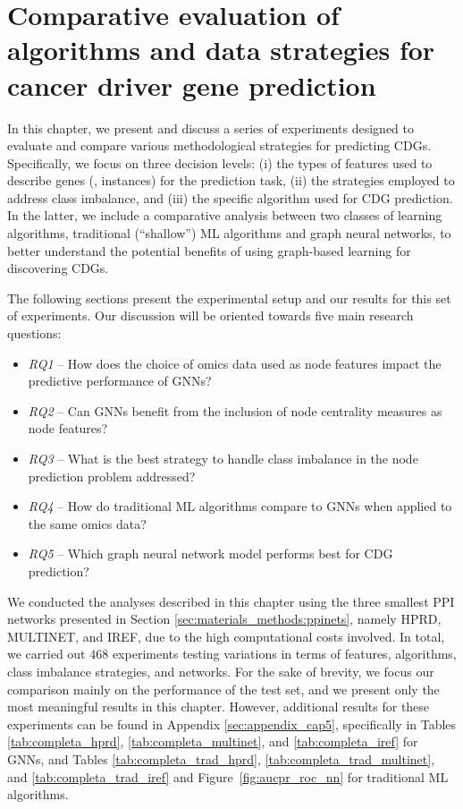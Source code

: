 \chapter{Comparative evaluation of algorithms and data strategies for cancer driver gene prediction}
\label{sec:results:comparative_evaluation}


In this chapter, we present and discuss a series of experiments designed to evaluate and compare various methodological strategies for predicting CDGs. Specifically, we focus on three decision levels: (i) the types of features used to describe genes (\ie, instances) for the prediction task, (ii) the strategies employed to address class imbalance, and (iii) the specific algorithm used for CDG prediction. In the latter, we include a comparative analysis between two classes of learning algorithms, traditional (\ie ``shallow'') ML algorithms and graph neural networks, to better understand the potential benefits of using graph-based learning for discovering CDGs. 


The following sections present the experimental setup and our results for this set of experiments. Our discussion will be oriented towards five main research questions:
\begin{itemize}
  \item \textit{RQ1} -- How does the choice of omics data used as node features impact the predictive performance of GNNs?
  \item \textit{RQ2} -- Can GNNs benefit from the inclusion of node centrality measures as node features?
  \item \textit{RQ3} -- What is the best strategy to handle class imbalance in the node prediction problem addressed?
  \item \textit{RQ4} -- How do traditional ML algorithms compare to GNNs when applied to the same omics data?
  \item \textit{RQ5} -- Which graph neural network model performs best for CDG prediction?
\end{itemize}

We conducted the analyses described in this chapter using the three smallest PPI networks presented in Section \ref{sec:materials_methods:ppinets}, namely HPRD, MULTINET, and IREF, due to the high computational costs involved. In total, we carried out 468 experiments testing variations in terms of features, algorithms, class imbalance strategies, and networks. For the sake of brevity, we focus our comparison mainly on the performance of the test set, and we present only the most meaningful results in this chapter. However, additional results for these experiments can be found in Appendix \ref{sec:appendix_cap5}, specifically in Tables \ref{tab:completa_hprd}, \ref{tab:completa_multinet}, and \ref{tab:completa_iref} for GNNs, and Tables \ref{tab:completa_trad_hprd}, \ref{tab:completa_trad_multinet}, and  \ref{tab:completa_trad_iref} and Figure~\ref{fig:aucpr_roc_nn} for traditional ML algorithms. 

